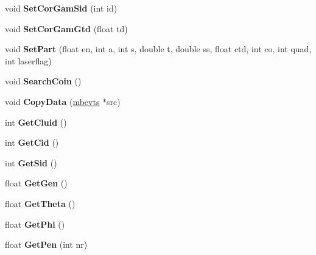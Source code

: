 \begin{DoxyCompactItemize}
\mbox{\label{classmbevts_ac45f4603202f0ab85a53eaa5a673bef5}} 
void {\bfseries Set\+Cor\+Gam\+Sid} (int id)
\item 
\mbox{\label{classmbevts_ad7d391a92762ab040292cb7b3e8418d2}} 
void {\bfseries Set\+Cor\+Gam\+Gtd} (float td)
\item 
\mbox{\label{classmbevts_ae50ea28b00271769bb542fca2fd64496}} 
void {\bfseries Set\+Part} (float en, int a, int s, double t, double ss, float ctd, int co, int quad, int laserflag)
\item 
\mbox{\label{classmbevts_a87461604de891dbc34c31fcd8af590af}} 
void {\bfseries Search\+Coin} ()
\item 
\mbox{\label{classmbevts_a3dd5bb0d3f29f7aacf8fe47a999b145e}} 
void {\bfseries Copy\+Data} (\hyperlink{classmbevts}{mbevts} $\ast$src)
\item 
\mbox{\label{classmbevts_a1c5fb6ab284e545a6b217d62f0071704}} 
int {\bfseries Get\+Cluid} ()
\item 
\mbox{\label{classmbevts_a14e93c89cf1cd54c013258018408f502}} 
int {\bfseries Get\+Cid} ()
\item 
\mbox{\label{classmbevts_a9d6088f98d2cbf47a2b800707f69d329}} 
int {\bfseries Get\+Sid} ()
\item 
\mbox{\label{classmbevts_a77ebeb78945522f0aeeb72f3ba1f7778}} 
float {\bfseries Get\+Gen} ()
\item 
\mbox{\label{classmbevts_aa960d2d6dcb37527ec7c61bb47ae7112}} 
float {\bfseries Get\+Theta} ()
\item 
\mbox{\label{classmbevts_abecac6009c213da0548446729e64767f}} 
float {\bfseries Get\+Phi} ()
\item 
\mbox{\label{classmbevts_a751112e09e3b8743d1470e8ab1191dd1}} 
float {\bfseries Get\+Pen} (int nr)
\item 
\mbox{\label{classmbevts_aa68e7ed695cb268d8ab70bb3fda5740c}} 

\end{DoxyCompactItemize}
